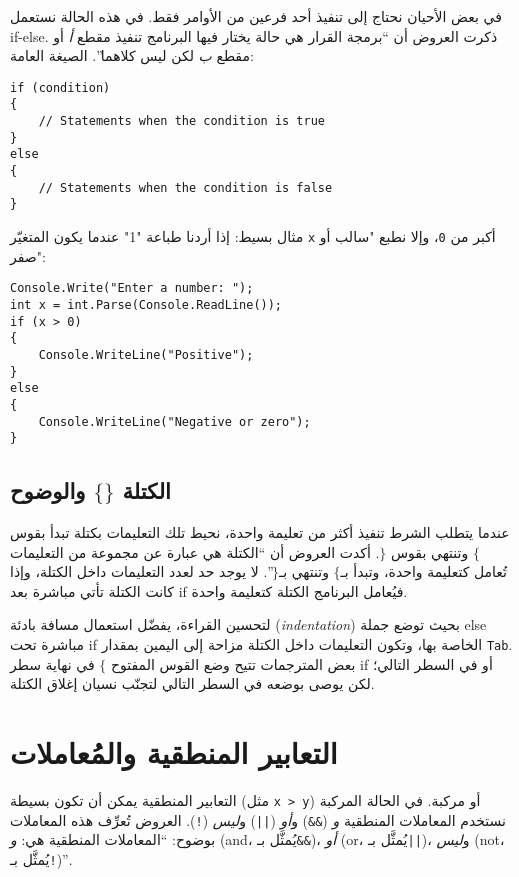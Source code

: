 \documentclass[12pt]{article}
\begin{document}
في بعض الأحيان نحتاج إلى تنفيذ أحد فرعين من الأوامر فقط. في هذه الحالة نستعمل \textenglish{if-else}. ذكرت العروض أن ``برمجة القرار هي حالة يختار فيها البرنامج تنفيذ مقطع \emph{أ} أو مقطع \emph{ب} لكن ليس كلاهما''. الصيغة العامة:

\begin{english}
\begin{verbatim}
if (condition)
{
    // Statements when the condition is true
}
else
{
    // Statements when the condition is false
}
\end{verbatim}
\end{english}

مثال بسيط: إذا أردنا طباعة "1" عندما يكون المتغيّر \texttt{x} أكبر من \texttt{0}، وإلا نطبع "سالب أو صفر":

\begin{english}
\begin{verbatim}
Console.Write("Enter a number: ");
int x = int.Parse(Console.ReadLine());
if (x > 0)
{
    Console.WriteLine("Positive");
}
else
{
    Console.WriteLine("Negative or zero");
}
\end{verbatim}
\end{english}

\subsection{الكتلة $\{\}$ والوضوح}

عندما يتطلب الشرط تنفيذ أكثر من تعليمة واحدة، نحيط تلك التعليمات بكتلة تبدأ بقوس $\{$ وتنتهي بقوس $\}$. أكدت العروض أن ``الكتلة هي عبارة عن مجموعة من التعليمات تُعامل كتعليمة واحدة، وتبدأ بـ$\{$ وتنتهي بـ$\}$''. لا يوجد حد لعدد التعليمات داخل الكتلة، وإذا كانت الكتلة تأتي مباشرة بعد \textenglish{if} فيُعامل البرنامج الكتلة كتعليمة واحدة.

لتحسين القراءة، يفضّل استعمال مسافة بادئة (\emph{indentation}) بحيث توضع جملة \textenglish{else} مباشرة تحت \textenglish{if} الخاصة بها، وتكون التعليمات داخل الكتلة مزاحة إلى اليمين بمقدار \texttt{Tab}. بعض المترجمات تتيح وضع القوس المفتوح $\{$ في نهاية سطر \textenglish{if} أو في السطر التالي؛ لكن يوصى بوضعه في السطر التالي لتجنّب نسيان إغلاق الكتلة.

\section{التعابير المنطقية والمُعاملات}

التعابير المنطقية يمكن أن تكون بسيطة (مثل \verb|x > y|) أو مركبة. في الحالة المركبة نستخدم المعاملات المنطقية \emph{و} (\texttt{\&\&}) و\emph{أو} (\texttt{||}) و\emph{ليس} (\texttt{!}). العروض تُعرِّف هذه المعاملات بوضوح: ``المعاملات المنطقية هي: \emph{و} (\textenglish{and}، يُمثَّل بـ\texttt{\&\&})، \emph{أو} (\textenglish{or}، يُمثَّل بـ\texttt{||})، و\emph{ليس} (\textenglish{not}، يُمثَّل بـ\texttt{!})''.
\end{document}
